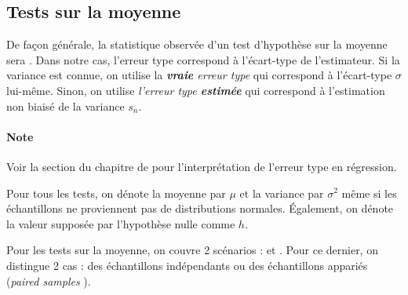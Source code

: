 \documentclass[french]{article}
\begin{document}
\begin{multicols*}{2}
\begin{center}
\end{center}



\columnbreak
\subsection{Tests sur la moyenne}\label{subsec:MeanTests}
De façon générale, la statistique observée d'un test d'hypothèse sur la moyenne sera . Dans notre cas, l'erreur type correspond à l'écart-type de l'estimateur. Si la variance est connue, on utilise la \textit{\textbf{vraie} erreur type} qui correspond à l'écart-type $\sigma$ lui-même. Sinon, on utilise \textit{l'erreur type \textbf{estimée}} qui correspond à l'estimation non biaisé de la variance $s_{n}$.

\paragraph{Note}	Voir la section \underline{\textit{}} du chapitre de \underline{\textit{}} pour l'interprétation de l'erreur type en régression.

\bigskip

Pour tous les tests, on dénote la moyenne par $\mu$ et la variance par $\sigma^{2}$ même si les échantillons ne proviennent pas de distributions normales. Également, on dénote la valeur supposée par l'hypothèse nulle comme $h$.

\bigskip

Pour les tests sur la moyenne, on couvre 2 scénarios : \textit{\underline{}} et \textit{\underline{}}. Pour ce dernier, on distingue 2 cas : des échantillons indépendants ou des échantillons appariés (\og \textit{paired samples} \fg{}).



\end{multicols*}
\end{document}
